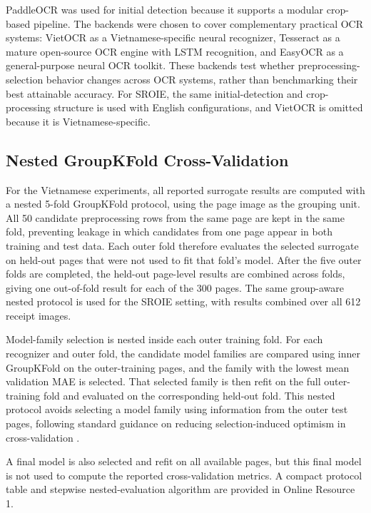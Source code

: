 \documentclass[pdflatex,sn-basic,Numbered,iicol]{sn-jnl}
\newcounter{algorithm}
\begin{document}
PaddleOCR was used for initial detection because it supports a modular crop-based pipeline. The backends were chosen to cover complementary practical OCR systems: VietOCR as a Vietnamese-specific neural recognizer, Tesseract as a mature open-source OCR engine with LSTM recognition, and EasyOCR as a general-purpose neural OCR toolkit. These backends test whether preprocessing-selection behavior changes across OCR systems, rather than benchmarking their best attainable accuracy. For SROIE, the same initial-detection and crop-processing structure is used with English configurations, and VietOCR is omitted because it is Vietnamese-specific.

\subsection{Nested GroupKFold Cross-Validation}

For the Vietnamese experiments, all reported surrogate results are computed with a nested 5-fold GroupKFold protocol, using the page image as the grouping unit. All 50 candidate preprocessing rows from the same page are kept in the same fold, preventing leakage in which candidates from one page appear in both training and test data. Each outer fold therefore evaluates the selected surrogate on held-out pages that were not used to fit that fold's model. After the five outer folds are completed, the held-out page-level results are combined across folds, giving one out-of-fold result for each of the 300 pages. The same group-aware nested protocol is used for the SROIE setting, with results combined over all 612 receipt images.

Model-family selection is nested inside each outer training fold. For each recognizer and outer fold, the candidate model families are compared using inner GroupKFold on the outer-training pages, and the family with the lowest mean validation MAE is selected. That selected family is then refit on the full outer-training fold and evaluated on the corresponding held-out fold. This nested protocol avoids selecting a model family using information from the outer test pages, following standard guidance on reducing selection-induced optimism in cross-validation \cite{varma2006bias,cawley2010overfitting,parvandeh2020consensus}.

A final model is also selected and refit on all available pages, but this final model is not used to compute the reported cross-validation metrics. A compact protocol table and stepwise nested-evaluation algorithm are provided in Online Resource 1.
\end{document}
